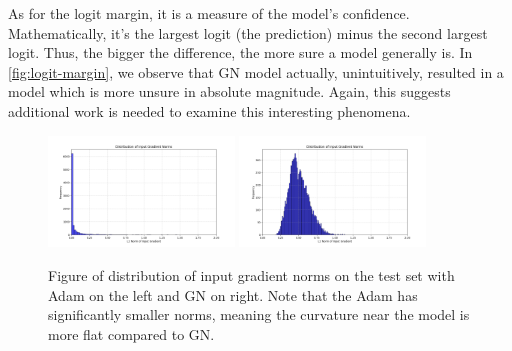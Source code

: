 \documentclass{article}
\begin{document}
    As for the logit margin, it is a measure of the model's confidence.
    Mathematically, it's the largest logit (the prediction) minus the second largest logit.
    Thus, the bigger the difference, the more sure a model generally is.
    In \cref{fig:logit-margin}, we observe that GN model actually, unintuitively, resulted in a model which is more unsure in absolute magnitude.
    Again, this suggests additional work is needed to examine this interesting phenomena.

    \begin{figure}[ht]
        \centering
        \includegraphics[width=0.44\textwidth]{../src/outputs/2025-09-10/23-05-38/input_gradient_norm_distribution.png}
        \includegraphics[width=0.44\textwidth]{../src/outputs/2025-09-10/23-05-59/input_gradient_norm_distribution.png}
        \caption{Figure of distribution of input gradient norms on the test set with Adam on the left and GN on right.
        Note that the Adam has significantly smaller norms, meaning the curvature near the model is more flat compared to GN.}
        \label{fig:grad-norm}
    \end{figure}
\end{document}
